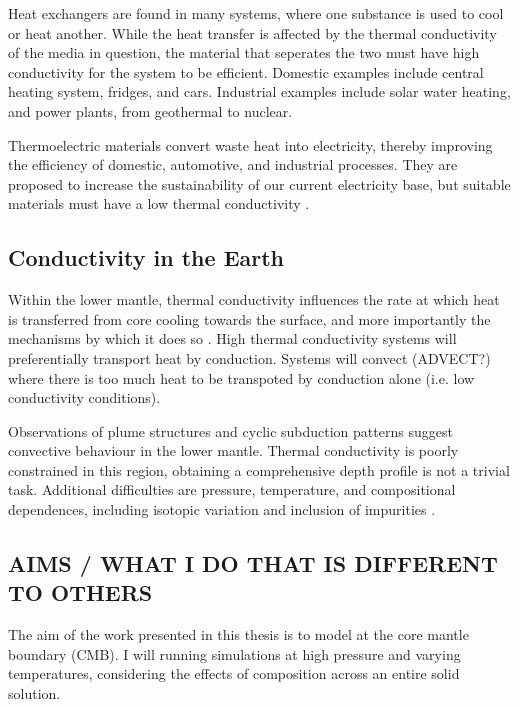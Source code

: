 Heat exchangers are found in many systems, where one substance is used to cool or heat another. While the heat transfer is affected by the thermal conductivity of the media in question, the material that seperates the two must have high conductivity for the system to be efficient. Domestic examples include central heating system, fridges, and cars. Industrial examples include solar water heating, and power plants, from geothermal to nuclear.

Thermoelectric materials convert waste heat into electricity, thereby improving the efficiency of domestic, automotive, and industrial processes. They are proposed to increase the sustainability of our current electricity base, but suitable materials must have a low thermal conductivity \citep{Snyder2008}.

\subsection{Conductivity in the Earth}

Within the lower mantle, thermal conductivity influences the rate at which heat is transferred from core cooling towards the surface, and more importantly the mechanisms by which it does so \citep{Lay2008}. High thermal conductivity systems will preferentially transport heat by conduction. Systems will convect (ADVECT?) where there is too much heat to be transpoted by conduction alone (i.e. low conductivity conditions).

Observations of plume structures and cyclic subduction patterns \citep[see][]{Garnero2008} suggest convective behaviour in the lower mantle. Thermal conductivity is poorly constrained in this region, obtaining a comprehensive depth profile is not a trivial task. Additional difficulties are pressure, temperature, and compositional dependences, including isotopic variation \citep{Tang2010,Dalton2013,Tang2014} and inclusion of impurities \citep{Manthilake2011,Ammann2014,Ohta2014}.

\subsection{AIMS / WHAT I DO THAT IS DIFFERENT TO OTHERS}

The aim of the work presented in this thesis is to model \tcs at the core mantle boundary (CMB). I will running simulations at high pressure and varying temperatures, considering the effects of composition across an entire solid solution. 

